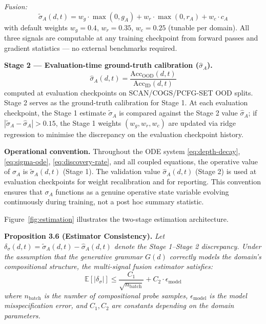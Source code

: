 \documentclass[10pt]{article}
\begin{document}
\textit{Fusion:}
\begin{equation}\label{eq:fusion}
\tilde{\sigma}_A(d,t) = w_g \cdot \max(0, g_A) + w_r \cdot \max(0, r_A) + w_c \cdot c_A
\end{equation}
with default weights $w_g = 0.4$, $w_r = 0.35$, $w_c = 0.25$ (tunable per
domain). All three signals are computable at any training checkpoint from
forward passes and gradient statistics --- no external benchmarks required.

\textbf{Stage 2 --- Evaluation-time ground-truth calibration ($\hat{\sigma}_A$).}
\begin{equation}
\hat{\sigma}_A(d,t) = \frac{\text{Acc}_{\text{OOD}}(d,t)}{\text{Acc}_{\text{ID}}(d,t)}
\label{eq:sgg-proxy}
\end{equation}
computed at evaluation checkpoints on SCAN/COGS/PCFG-SET OOD splits.
Stage 2 serves as the ground-truth calibration for Stage 1. At each
evaluation checkpoint, the Stage 1 estimate $\tilde{\sigma}_A$ is compared
against the Stage 2 value $\hat{\sigma}_A$; if
$|\tilde{\sigma}_A - \hat{\sigma}_A| > 0.15$, the Stage 1 weights
$(w_g, w_r, w_c)$ are updated via ridge regression to minimise the
discrepancy on the evaluation checkpoint history.

\textbf{Operational convention.} Throughout the ODE system
\eqref{eq:depth-decay}, \eqref{eq:sigma-ode},
\eqref{eq:discovery-rate}, and all coupled equations, the operative
value of $\sigma_A$ is $\tilde{\sigma}_A(d,t)$ (Stage 1). The validation
value $\hat{\sigma}_A(d,t)$ (Stage 2) is used at evaluation checkpoints
for weight recalibration and for reporting. This convention ensures that
$\sigma_A$ functions as a genuine operative state variable evolving
continuously during training, not a post hoc summary statistic.



Figure~\ref{fig:estimation} illustrates the two-stage estimation architecture.

\textbf{Proposition 3.6 (Estimator Consistency).} %
\textit{Let $\delta_\sigma(d,t) = \tilde{\sigma}_A(d,t) - \hat{\sigma}_A(d,t)$
denote the Stage 1--Stage 2 discrepancy. Under the assumption that the
generative grammar $G(d)$ correctly models the domain's compositional
structure, the multi-signal fusion estimator satisfies:
\begin{equation}\label{eq:estimator-bound}
\mathbb{E}[|\delta_\sigma|] \leq \frac{C_1}{\sqrt{n_{\text{batch}}}} + C_2 \cdot \epsilon_{\text{model}}
\end{equation}
where $n_{\text{batch}}$ is the number of compositional probe samples,
$\epsilon_{\text{model}}$ is the model misspecification error, and $C_1, C_2$
are constants depending on the domain parameters.}
\end{document}
